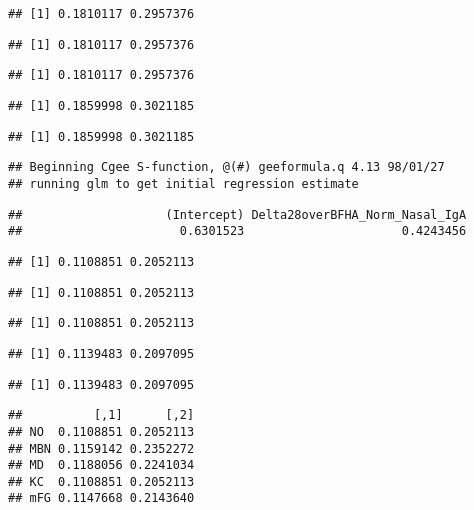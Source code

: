 \documentclass[
]{article}
\begin{document}
\begin{verbatim}
## [1] 0.1810117 0.2957376
\end{verbatim}

\begin{verbatim}
## [1] 0.1810117 0.2957376
\end{verbatim}

\begin{verbatim}
## [1] 0.1810117 0.2957376
\end{verbatim}

\begin{verbatim}
## [1] 0.1859998 0.3021185
\end{verbatim}

\begin{verbatim}
## [1] 0.1859998 0.3021185
\end{verbatim}

\begin{verbatim}
## Beginning Cgee S-function, @(#) geeformula.q 4.13 98/01/27
## running glm to get initial regression estimate
\end{verbatim}

\begin{verbatim}
##                    (Intercept) Delta28overBFHA_Norm_Nasal_IgA 
##                      0.6301523                      0.4243456
\end{verbatim}

\begin{verbatim}
## [1] 0.1108851 0.2052113
\end{verbatim}

\begin{verbatim}
## [1] 0.1108851 0.2052113
\end{verbatim}

\begin{verbatim}
## [1] 0.1108851 0.2052113
\end{verbatim}

\begin{verbatim}
## [1] 0.1139483 0.2097095
\end{verbatim}

\begin{verbatim}
## [1] 0.1139483 0.2097095
\end{verbatim}

\begin{verbatim}
##          [,1]      [,2]
## NO  0.1108851 0.2052113
## MBN 0.1159142 0.2352272
## MD  0.1188056 0.2241034
## KC  0.1108851 0.2052113
## mFG 0.1147668 0.2143640
\end{verbatim}
\end{document}

